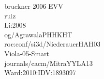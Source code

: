 %
%
%
%
bruckner-2006-EVV\cite{proc:bruckner-2006-EVV}\\
ruiz \cite{proc:ruiz-2008-SEV} \\
Li:2008\cite{proc:Li:2008:AGI} \\
og/AgrawalaPHHKHT\cite{journals/tog/AgrawalaPHHKHT03}\\
roc:conf/si3d/NiederauerHAH03\cite{proc:conf/si3d/NiederauerHAH03}\\
Viola-05-Smart\cite{Viola-05-Smart}\\
journals/cacm/MitraYYLA13\cite{journals/cacm/MitraYYLA13}\\
Ward:2010:IDV:1893097\cite{Ward:2010:IDV:1893097}\\
